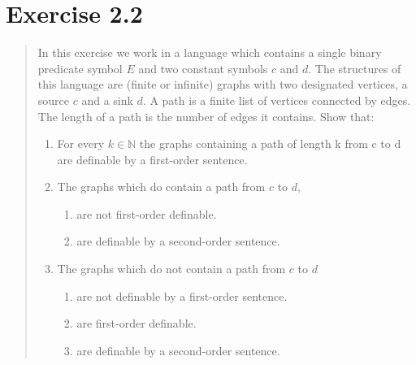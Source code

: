 \documentclass[11pt,a4paper]{article}
\begin{document}

%	




\section*{Exercise 2.2}
\begin{quote}
In this exercise we work in a language which contains a single binary predicate
symbol $E$ and two constant symbols $c$ and $d$. The structures of this language are (finite or
infinite) graphs with two designated vertices, a source $c$ and a sink $d$. A path is a finite list of vertices connected by edges. The length of a path is the number of edges it contains.
Show that:

\begin{enumerate}
\item  For every $k \in \mathbb{N}$ the graphs containing a path of length k from c to d are definable by a
first-order sentence.
\item The graphs which do contain a path from $c$ to $d$,
\begin{enumerate}
\item are not first-order definable.
\item are definable by a second-order sentence.
\end{enumerate}
\item The graphs which do not contain a path from $c$ to $d$
\begin{enumerate}
\item are not definable by a first-order sentence.
\item are first-order definable.
\item are definable by a second-order sentence.
\end{enumerate}
\end{enumerate}
\end{quote}
\end{document}
